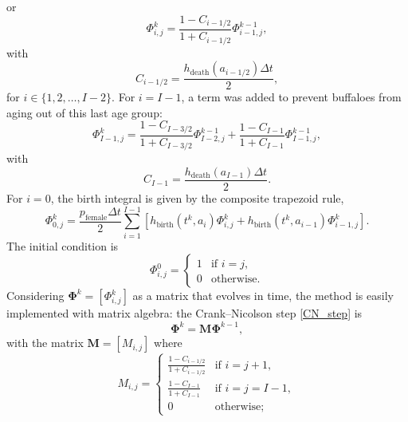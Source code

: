 \documentclass[12pt]{article}
\newcommand{\mat}[1]{\mathbf{#1}}
\begin{document}
or
\begin{equation}
  \Phi_{i, j}^k
  = \frac{1 - C_{i - 1 / 2}}{1 + C_{i - 1 / 2}}
  \Phi_{i - 1, j}^{k - 1},
\end{equation}
with
\begin{equation}
  C_{i - 1 / 2}
  = \frac{h_{\text{death}}(a_{i - 1 / 2}) \Delta t}{2},
\end{equation}
for $i \in \{1, 2, \ldots, I - 2\}$.  For $i = I - 1$,
a term was added to prevent buffaloes from aging out of this
last age group:
\begin{equation}
  \Phi_{I - 1, j}^k
  = \frac{1 - C_{I - 3 / 2}}{1 + C_{I - 3 / 2}}
  \Phi_{I - 2, j}^{k - 1}
  + \frac{1 - C_{I - 1}}{1 + C_{I - 1}}
  \Phi_{I - 1, j}^{k - 1},
\end{equation}
with
\begin{equation}
  C_{I - 1}
  = \frac{h_{\text{death}}(a_{I - 1}) \Delta t}{2}.
\end{equation}
For $i = 0$, the birth integral is given by the composite trapezoid rule,
\begin{equation}
  \label{birth_step}
  \Phi_{0, j}^k =
  \frac{p_{\text{female}} \Delta t}{2}
  \sum_{i = 1}^{I - 1}
  \left[h_{\text{birth}}(t^k, a_i) \Phi_{i, j}^k +
    h_{\text{birth}}(t^k, a_{i - 1}) \Phi_{i - 1, j}^k\right].
\end{equation}
The initial condition is
\begin{equation}
  \Phi_{i, j}^0 =
  \begin{cases}
    1 & \text{if $i = j$}, \\
    0 & \text{otherwise}.
  \end{cases}
\end{equation}
Considering $\mat{\Phi}^k = [\Phi_{i, j}^k]$ as a matrix that
evolves in time, the method is easily implemented with matrix algebra:
the Crank--Nicolson step \eqref{CN_step} is
\begin{equation}
  \mat{\Phi}^k = \mat{M} \mat{\Phi}^{k - 1},
\end{equation}
with the matrix $\mat{M} = [M_{i, j}]$ where
\begin{equation}
  M_{i, j} =
  \begin{cases}
    \frac{1 - C_{i - 1 / 2}}{1 + C_{i - 1 / 2}}
    & \text{if $i = j + 1$}, \\
    \frac{1 - C_{I - 1}}{1 + C_{I - 1}} & \text{if $i = j = I - 1$}, \\
    0 & \text{otherwise};
  \end{cases}
\end{equation}
\end{document}
